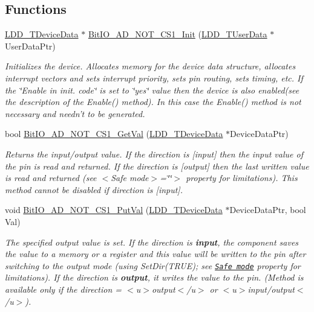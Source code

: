 \subsection*{Functions}
\begin{DoxyCompactItemize}
\item 
\hyperlink{group___p_e___types__module_gac5cf1362f1f0e3a2ce71b1bf2276d091}{L\-D\-D\-\_\-\-T\-Device\-Data} $\ast$ \hyperlink{group___bit_i_o___a_d___n_o_t___c_s1__module_gab85945d69adf4f40df7adad1818690df}{Bit\-I\-O\-\_\-\-A\-D\-\_\-\-N\-O\-T\-\_\-\-C\-S1\-\_\-\-Init} (\hyperlink{group___p_e___types__module_ga0b66a73f87238a782318aa0be7578e35}{L\-D\-D\-\_\-\-T\-User\-Data} $\ast$User\-Data\-Ptr)
\begin{DoxyCompactList}\small\item\em Initializes the device. Allocates memory for the device data structure, allocates interrupt vectors and sets interrupt priority, sets pin routing, sets timing, etc. If the \char`\"{}\-Enable
    in init. code\char`\"{} is set to \char`\"{}yes\char`\"{} value then the device is also enabled(see the description of the Enable() method). In this case the Enable() method is not necessary and needn't to be generated. \end{DoxyCompactList}\item 
bool \hyperlink{group___bit_i_o___a_d___n_o_t___c_s1__module_ga73cf41b12e8731f899465fad778a0794}{Bit\-I\-O\-\_\-\-A\-D\-\_\-\-N\-O\-T\-\_\-\-C\-S1\-\_\-\-Get\-Val} (\hyperlink{group___p_e___types__module_gac5cf1362f1f0e3a2ce71b1bf2276d091}{L\-D\-D\-\_\-\-T\-Device\-Data} $\ast$Device\-Data\-Ptr)
\begin{DoxyCompactList}\small\item\em Returns the input/output value. If the direction is \mbox{[}input\mbox{]} then the input value of the pin is read and returned. If the direction is \mbox{[}output\mbox{]} then the last written value is read and returned (see $<$\-Safe mode$>$=\char`\"{}\char`\"{}$>$ property for limitations). This method cannot be disabled if direction is \mbox{[}input\mbox{]}. \end{DoxyCompactList}\item 
void \hyperlink{group___bit_i_o___a_d___n_o_t___c_s1__module_ga81e2e5affe80ba7b2fb99fa088dab790}{Bit\-I\-O\-\_\-\-A\-D\-\_\-\-N\-O\-T\-\_\-\-C\-S1\-\_\-\-Put\-Val} (\hyperlink{group___p_e___types__module_gac5cf1362f1f0e3a2ce71b1bf2276d091}{L\-D\-D\-\_\-\-T\-Device\-Data} $\ast$Device\-Data\-Ptr, bool Val)
\begin{DoxyCompactList}\small\item\em The specified output value is set. If the direction is {\bfseries  input}, the component saves the value to a memory or a register and this value will be written to the pin after switching to the output mode (using {\ttfamily Set\-Dir(\-T\-R\-U\-E)}; see \href{BitIOProperties.html#SafeMode}{\tt Safe mode} property for limitations). If the direction is {\bfseries output}, it writes the value to the pin. (Method is available only if the direction = $<$u$>${\ttfamily output}$<$/u$>$ or $<$u$>${\ttfamily  input/output}$<$/u$>$). \end{DoxyCompactList}\item 

\end{DoxyCompactItemize}
